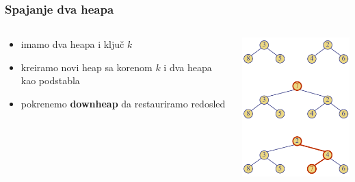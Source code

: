 \documentclass[compress,aspectratio=169]{beamer}
\begin{document}
\begin{frame}[fragile]
  \frametitle{Spajanje dva heapa}
  \begin{columns}
    \begin{column}[c]{6cm}
      \begin{itemize}
        \item imamo dva heapa i ključ $k$
        \item kreiramo novi heap sa korenom $k$ i dva heapa kao podstabla
        \item pokrenemo \textbf{downheap} da restauriramo redosled
      \end{itemize}
    \end{column}
    \begin{column}[c]{5cm}
      \begin{center}
        \includegraphics[width=5cm]{asp-09-pic12.png}
      \end{center}
    \end{column}
  \end{columns}
\end{frame}
\end{document}
